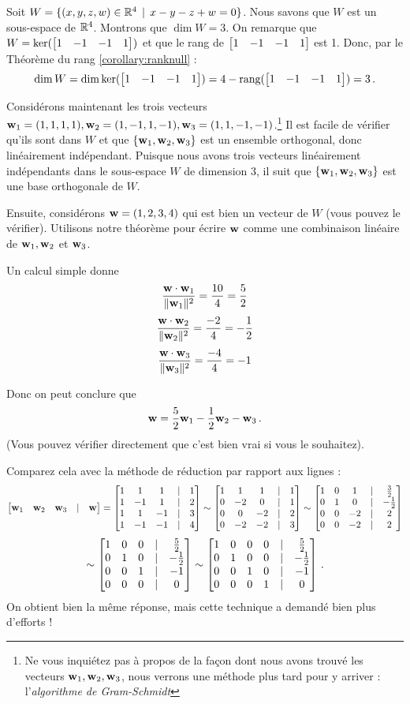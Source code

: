 \begin{myexample}
Soit $W=\{(x,y,z,w) \in \mathbb{R}^4 \, \mid \, x-y-z+w=0\}$. Nous savons que $W$ est un sous-espace de $\mathbb{R}^4$. Montrons que $\dim W=3$. On remarque que $W=\ker(\bmatrix1&-1&-1&1 \endbmatrix)$ et que le rang de $\bmatrix1&-1&-1&1 \endbmatrix$ est 1. Donc, par le Théorème du rang \ref{corollary:ranknull} : $$\dim W= \dim \ker(\bmatrix1&-1&-1&1 \endbmatrix)=4-\rank(\bmatrix1&-1&-1&1 \endbmatrix)=3\,.$$

Considérons maintenant les trois vecteurs  $\mathbf{w}_1=(1,1,1,1), \mathbf{w}_2=(1,-1,1,-1),\mathbf{w}_3=(1,1,-1,-1)$.\footnote{Ne vous inquiétez pas à propos de la façon dont nous avons trouvé les vecteurs $\mathbf{w}_1, \mathbf{w}_2, \mathbf{w}_3$, nous verrons une méthode plus tard pour y arriver : l'\emph{algorithme de Gram-Schmidt}} Il est facile de vérifier qu'ils sont dans $W$ et que $\{\mathbf{w}_1,\mathbf{w}_2,\mathbf{w}_3\}$ est un ensemble orthogonal, donc linéairement indépendant. Puisque nous avons trois vecteurs linéairement indépendants dans le sous-espace $W$ de dimension 3, il suit que $\{\mathbf{w}_1,\mathbf{w}_2,\mathbf{w}_3\}$ est une base orthogonale de $W$.

Ensuite, considérons $\mathbf{w} = (1,2,3,4)$ qui est bien un vecteur de $W$ (vous pouvez le vérifier). Utilisons notre théorème pour écrire $\mathbf{w}$ comme une combinaison linéaire de
 $ \mathbf{w}_1,\mathbf{w}_2$ et $\mathbf{w}_3$.



Un calcul simple donne
$$
\frac{\mathbf{w}\cdot \mathbf{w}_1}{\|\mathbf{w}_1\|^2} = \frac{10}{4} = \frac52
$$
$$
\frac{\mathbf{w}\cdot \mathbf{w}_2}{\|\mathbf{w}_2\|^2} = \frac{-2}{4} = -\frac12
$$
$$
\frac{\mathbf{w}\cdot \mathbf{w}_3}{\|\mathbf{w}_3\|^2} = \frac{-4}{4} = -1
$$

Donc on peut conclure que
$$
\mathbf{w} = \frac52\mathbf{w}_1 - \frac12\mathbf{w}_2 - \mathbf{w}_3\,.
$$
(Vous pouvez vérifier directement que c'est bien vrai si vous le souhaitez).

Comparez cela avec la méthode de réduction par rapport aux lignes :
$$ \left[ \begin{matrix} \mathbf{w}_1 &\mathbf{w}_2 &\mathbf{w}_3&|&\mathbf{w} \end{matrix} \right]=
\left[ \begin{matrix} 
1 & 1  & 1 &   |& 1\\
1 & -1 & 1 &   |& 2\\
1 & 1  & -1 &   |& 3\\
1 & -1 & -1 &   |& 4 \end{matrix} \right]
\sim
\left[ \begin{matrix} 
1 & 1  & 1 &   |& 1\\
0 & -2 & 0 &   |& 1\\
0 & 0  & -2 &   |& 2\\
0 & -2 & -2 &  |& 3 \end{matrix} \right]
\sim
\left[ \begin{matrix} 
1 & 0  &  1 &   |& \frac32\\
0 & 1 &   0 &  |& -\frac12\\
0 & 0  & -2 &   |& 2\\
0 & 0 & -2 &   |& 2 \end{matrix} \right]
$$
$$
\sim
\left[ \begin{matrix} 
1 & 0  &  0 &   |& \frac52\\
0 & 1 &   0 &   |& -\frac12\\
0 & 0  & 1 &   |& -1\\
0 & 0 & 0 &   |& 0 \end{matrix} \right]
\sim
\left[ \begin{matrix} 
1 & 0  &  0 & 0 & |& \frac52\\
0 & 1 &   0 & 0 & |& -\frac12\\
0 & 0  & 1 & 0 & |& -1\\
0 & 0 & 0 & 1 & |& 0 \end{matrix} \right]\,.
$$
On obtient bien la même réponse, mais cette technique a demandé bien plus d'efforts !
\end{myexample}

